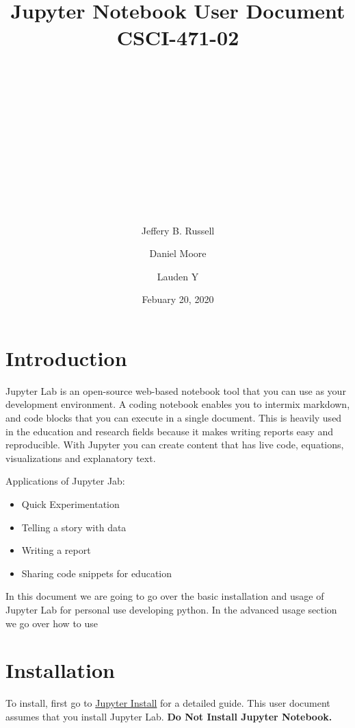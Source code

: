 \documentclass[pdftex,12pt]{artikel3}
\title{
\begin{center}
\huge{Jupyter Notebook User Document} \\
\huge{CSCI-471-02}\\
\end{center}
\\
\\
\\
\\
\\
\author{} %
\date{}   %
}
\begin{document}
\maketitle


\begin{center}
\author{Jeffery B. Russell}
\author{Daniel Moore}
\author{Lauden Y}

\date{Febuary 20, 2020}
\end{center}

\newpage

\tableofcontents
{}
\newpage
\listoffigures
{}

\newpage

\section{Introduction}

Jupyter Lab is an open-source web-based notebook tool that you can use as your development environment.
A coding notebook enables you to intermix markdown, and code blocks that you can execute in a single document. This is heavily used in the education and research fields because it makes writing reports easy and reproducible. With Jupyter you can create content that has live code, equations, visualizations and explanatory text. 

Applications of Jupyter Jab:

\begin{itemize}
  \item Quick Experimentation
  \item Telling a story with data
  \item Writing a report
  \item Sharing code snippets for education
\end{itemize}

In this document we are going to go over the basic installation and usage of Jupyter Lab for personal use developing python. In the advanced usage section we go over how to use 

\section{Installation}

To install, first go to \href{https://jupyterlab.readthedocs.io/en/stable/getting_started/installation.html}{Jupyter Install} for a detailed guide. This user document assumes that you install Jupyter Lab. \textbf{Do Not Install Jupyter Notebook. }
\end{document}
